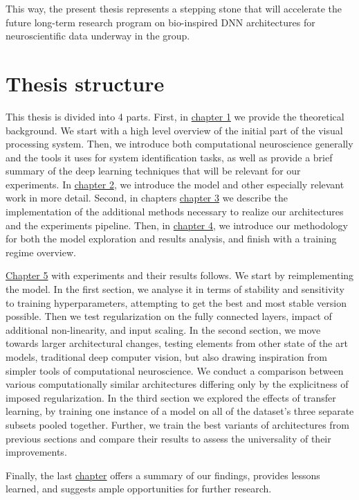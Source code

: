 This way, the present thesis represents a stepping stone that will accelerate the future long-term research program on bio-inspired DNN architectures for neuroscientific data underway in the \citeauthor{antolik} group.

\section*{Thesis structure}
This thesis is divided into 4 parts. First, in \hyperref[ch:1]{chapter 1} we provide the theoretical background. We start with a high level overview of the initial part of the visual processing system. Then, we introduce both computational neuroscience generally and the tools it uses for system identification tasks, as well as provide a brief summary of the deep learning techniques that will be relevant for our experiments. In \hyperref[ch:2]{chapter 2}, we introduce the \citeauthor{antolik} model and other especially relevant work in more detail. Second, in chapters \hyperref[ch:3]{chapter 3} we describe the implementation of the additional methods necessary to realize our architectures and the experiments pipeline. Then, in \hyperref[ch:4]{chapter 4}, we introduce our methodology for both the model exploration and results analysis, and finish with a training regime overview.

\hyperref[ch:5]{Chapter 5} with experiments and their results follows. We start by reimplementing the \citeauthor{antolik} model. In the first section, we analyse it in terms of stability and sensitivity to training hyperparameters, attempting to get the best and most stable version possible. Then we test regularization on the fully connected layers, impact of additional non-linearity, and input scaling. In the second section, we move towards larger architectural changes, testing elements from other state of the art models, traditional deep computer vision, but also drawing inspiration from simpler tools of computational neuroscience. We conduct a comparison between various computationally similar architectures differing only by the explicitness of imposed regularization. In the third section we explored the effects of transfer learning, by training one instance of a model on all of the dataset’s three separate subsets pooled together. Further, we train the best variants of architectures from previous sections and compare their results to assess the universality of their improvements.

Finally, the last \hyperref[ch:6]{chapter} offers a summary of our findings, provides lessons learned, and suggests ample opportunities for further research.